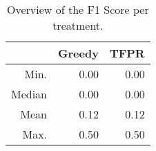 \begin{table}[ht]
\centering
\begin{tabular}{rrr}
  \hline
 & Greedy & TFPR \\ 
  \hline
Min. & 0.00 & 0.00 \\ 
  Median & 0.00 & 0.00 \\ 
  Mean & 0.12 & 0.12 \\ 
  Max. & 0.50 & 0.50 \\ 
   \hline
\end{tabular}
\caption{Overview of the F1 Score per treatment.} 
\label{tab:results:rq3:summary:treatment:f1_Score}
\end{table}
